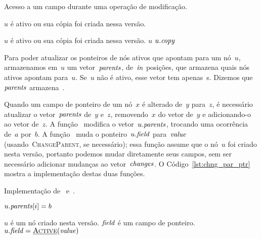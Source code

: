 \documentclass[../../main.tex]{subfiles}
\begin{document}
\begin{algorithm}
\caption{Acesso a um campo durante uma operação de modificação.} \label{lst:acc_mod}
\begin{algorithmic}[1]

\Require $u$ é ativo ou sua cópia foi criada nessa versão.
	\State \Return {}
\EndFunction

\Require $u$ é ativo ou sua cópia foi criada nessa versão.
		\State \Return $u$
	\Else
		\State \Return $u.\mathit{copy}$
	\EndIf
\EndFunction

\end{algorithmic}
\end{algorithm}

Para poder atualizar os ponteiros de nós ativos que apontam para um nó~$u$, armazenamos em~$u$ um vetor~$\mathit{parents}$, de~$\mathit{in}$ posições, que armazena quais nós ativos apontam para~$u$. Se~$u$ não é ativo, esse vetor tem apenas~s. Dizemos que~$\mathit{parents}$ armazena~.

Quando um campo de ponteiro de um nó~$x$ é alterado de~$y$ para~$z$, é necessário atualizar o vetor~$\mathit{parents}$ de~$y$ e~$z$, removendo~$x$ do vetor de~$y$ e adicionando-o ao vetor de~$z$. A função~\mbox{} modifica o vetor~$u.\mathit{parents}$, trocando uma ocorrência de~$a$ por~$b$. A função~\mbox{} muda o ponteiro~$u.\mathit{field}$ para~$\mathit{value}$ (usando~\textsc{ChangeParent}, se necessário); essa função assume que o nó~$u$ foi criado nesta versão, portanto podemos mudar diretamente seus campos, sem ser necessário adicionar mudanças ao vetor~$\mathit{changes}$. O Código~\ref{lst:chng_par_ptr} mostra a implementação destas duas funções.

\begin{algorithm}
\caption{Implementação de~\textsc{} e~\textsc{}.} \label{lst:chng_par_ptr}
\begin{algorithmic}[1]

			\State $u.\mathit{parents}[i] = b$
			\State \Break
		\EndIf
	\EndFor
\EndFunction

\Require $u$ é um nó criado nesta versão.
\Require $\mathit{field}$ é um campo de ponteiro.
		\State {}
	\EndIf
	\State $u.\V{field} = \Call{\auxfunc{Active}}{\V{value}}$ 
		\State {}
	\EndIf
\EndFunction

\end{algorithmic}
\end{algorithm}
\end{document}
